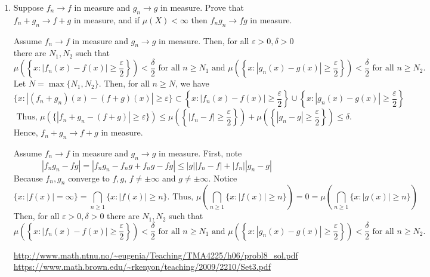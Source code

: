 \begin{enumerate}
\item Suppose $f_n \rightarrow f$ in measure and $g_n \rightarrow g$ in measure. Prove that $f_n + g_n \rightarrow f + g$ in measure, and if $\mu(X)< \infty$ then $f_ng_n \rightarrow fg $ in measure. 
\begin{pf}
Assume $f_n \rightarrow f$ in measure and $g_n \rightarrow g$ in measure. Then, for all $\varepsilon>0, \delta>0$ there are $N_1, N_2$ such that 
\[
 \mu\left(\left\{ x: |f_n(x)-f(x)|\geq \frac{\varepsilon}{2} \right\}\right)< \frac{\delta}{2} \text{ for all } n \geq N_1 \text{ and } \mu\left(\left\{ x: |g_n(x)-g(x)|\geq \frac{\varepsilon}{2} \right\}\right)< \frac{\delta}{2} \text{ for all } n \geq N_2.
 \]
 Let $N = \max\{ N_1, N_2\}$. Then, for all $n \geq N$, we have 
 \[
 \{x: |(f_n+g_n)(x) - (f+ g)(x)|\geq \varepsilon \} \subset \left\{x:  |f_n(x)-f(x)|\geq \frac{\varepsilon}{2} \right\} \cup \left\{x: |g_n(x)-g(x)|\geq\frac{\varepsilon}{2} \right\}
 \]
 \[
 \text{ Thus, } \mu \left(\{|f_n +g_n - (f+ g)|\geq \varepsilon \} \right) \leq \mu\left(\left\{ |f_n-f|\geq \frac{\varepsilon}{2} \right\}\right) +\mu\left( \left\{|g_n-g|\geq\frac{\varepsilon}{2} \right\}\right) \leq \delta.
 \]
 Hence, $f_n + g_n \rightarrow f + g$ in measure.
\end{pf}
\begin{pf}
	Assume $f_n \rightarrow f$ in measure and $g_n \rightarrow g$ in measure. First, note
	\[
	|f_ng_n - fg|= |f_ng_n - f_ng + f_ng - fg|\leq |g||f_n-f|+|f_n||g_n-g|
	\]Because $f_n, g_n$ converge to $f,g$, $f \neq \pm \infty$ and $g \neq \pm \infty$. Notice
	\[
	\{x: |f(x)| =  \infty \} = \bigcap_{n\geq 1} \{x: |f(x)| \geq n\}. \text{ Thus, } \mu \left( \bigcap_{n\geq 1} \{x: |f(x)| \geq n\}\right)=0 = \mu \left( \bigcap_{n\geq 1} \{x: |g(x)| \geq n\}\right)
	\]
	  Then, for all $\varepsilon>0, \delta>0$ there are $N_1, N_2$ such that 
\[
 \mu\left(\left\{ x: |f_n(x)-f(x)|\geq \frac{\varepsilon}{2} \right\}\right)< \frac{\delta}{2} \text{ for all } n \geq N_1 \text{ and } \mu\left(\left\{ x: |g_n(x)-g(x)|\geq \frac{\varepsilon}{2} \right\}\right)< \frac{\delta}{2} \text{ for all } n \geq N_2.
 \]

\end{pf}
	
\url{http://www.math.ntnu.no/~eugenia/Teaching/TMA4225/h06/probl8_sol.pdf}\\
\url{https://www.math.brown.edu/~rkenyon/teaching/2009/2210/Set3.pdf}
\end{enumerate}

